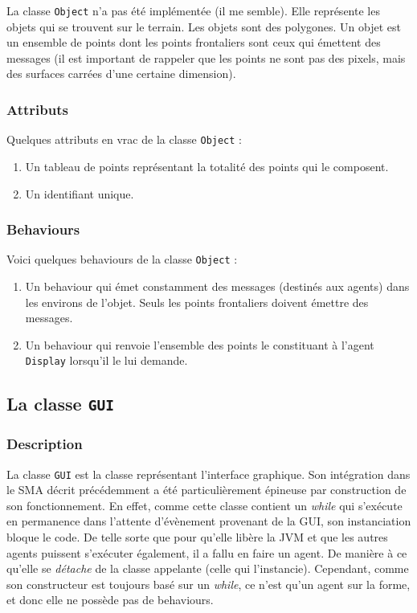 \documentclass[11pt]{report}
\begin{document}
La classe \verb|Object| n'a pas été implémentée (il me semble). Elle représente les objets qui se trouvent sur le terrain. Les objets sont des polygones. Un objet est un ensemble de points dont les points frontaliers sont ceux qui émettent des messages (il est important de rappeler que les points ne sont pas des pixels, mais des surfaces carrées d'une certaine dimension).

\subsubsection{Attributs}

Quelques attributs en vrac de la classe \verb|Object| :

\begin{enumerate}
\item Un tableau de points représentant la totalité des points qui le composent.

\item Un identifiant unique.
\end{enumerate}

\subsubsection{Behaviours}

Voici quelques behaviours de la classe \verb|Object| :

\begin{enumerate}
\item Un behaviour qui émet constamment des messages (destinés aux agents) dans les environs de l'objet. Seuls les points frontaliers doivent émettre des messages.

\item Un behaviour qui renvoie l'ensemble des points le constituant à l'agent \verb|Display| lorsqu'il le lui demande.
\end{enumerate}

\subsection{La classe \protect\Verb+GUI+}
\subsubsection{Description}

La classe \verb|GUI| est la classe représentant l'interface graphique. Son intégration dans le SMA décrit précédemment a été particulièrement épineuse par construction de son fonctionnement. En effet, comme cette classe contient un \textit{while} qui s'exécute en permanence dans l'attente d'évènement provenant de la GUI, son instanciation bloque le code. De telle sorte que pour qu'elle libère la JVM et que les autres agents puissent s'exécuter également, il a fallu en faire un agent. De manière à ce qu'elle se \textit{détache} de la classe appelante (celle qui l'instancie). Cependant, comme son constructeur est toujours basé sur un \textit{while}, ce n'est qu'un agent sur la forme, et donc elle ne possède pas de behaviours.
\end{document}
